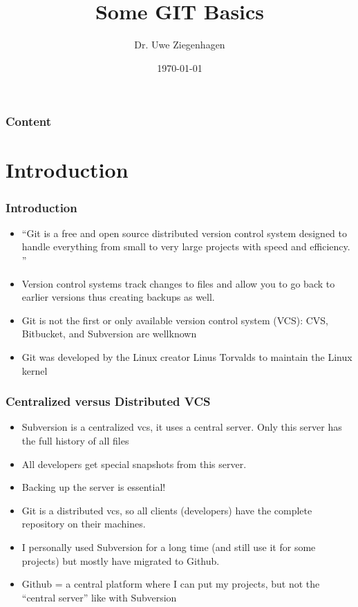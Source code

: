 \documentclass[12pt,english]{beamer}
\title{Some GIT Basics}
\date{\today}
\author{Dr. Uwe Ziegenhagen}
\institute{www.uweziegenhagen.de}
\begin{document}
 
\begin{frame}
	 \maketitle
\end{frame}
 
\begin{frame}
\frametitle{Content}

\tableofcontents
\end{frame}

\section{Introduction}

\begin{frame}
\frametitle{Introduction}
 
\begin{itemize}
\item \enquote{Git is a free and open source distributed version control system designed to handle everything from small to very large projects with speed and efficiency. }
\item Version control systems track changes to files and allow you to go back to earlier versions thus creating backups as well.
\item Git is not the first or only available version control system (VCS): CVS, Bitbucket, and Subversion are wellknown
\item Git was developed by the Linux creator Linus Torvalds to maintain the Linux kernel
\end{itemize}
\end{frame}
 
\begin{frame}
\frametitle{Centralized versus Distributed VCS}

\begin{itemize}
\item Subversion is a centralized vcs, it uses a central server. Only this server has the full history of all files
\item All developers get special snapshots from this server.
\item Backing up the server is essential!
\item Git is a distributed vcs, so all clients (developers) have the complete repository on their machines. 
\item I personally used Subversion for a long time (and still use it for some projects) but mostly have migrated to Github.
\item Github = a central platform where I can put my projects, but not the \enquote{central server} like with Subversion
\end{itemize}
\end{frame}
\end{document}
